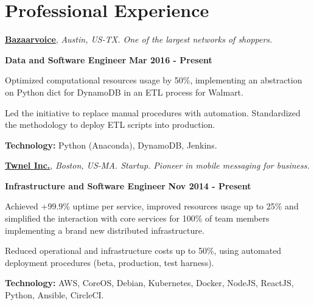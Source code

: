\section{Professional Experience}
%
\href{http://www.bazaarvoice.com/}{\textbf{Bazaarvoice}}, \textit{Austin, US-TX.
One of the largest networks of shoppers.}

\begin{outerlist}
\item[\FA \faAngleDoubleRight] \textbf{Data and Software Engineer}
\hfill
\textbf{Mar 2016 - Present}
\end{outerlist}

\begin{innerlist}
\item Optimized computational resources usage by 50\%, implementing
an abstraction on Python dict for DynamoDB in an ETL process for Walmart.
\item Led the initiative to replace manual procedures with automation.
Standardized the methodology to deploy ETL scripts into production.
\item \textbf{Technology:} Python (Anaconda), DynamoDB, Jenkins.
\end{innerlist}

\quarterblankline

\href{http://www.twnel.com/}{\textbf{Twnel Inc.}}, \textit{Boston, US-MA.
Startup.
Pioneer in mobile messaging for business.}

\begin{outerlist}
\item[\FA \faAngleDoubleRight] \textbf{Infrastructure and Software
Engineer}
\hfill
\textbf{Nov 2014 - Present}
\end{outerlist}

\begin{innerlist}
\item Achieved +99.9\% uptime per
service, improved resources usage up to 25\% and simplified the
interaction with core services for 100\% of team members implementing a brand
new distributed infrastructure.
\item Reduced operational and infrastructure costs up to 50\%, using automated
deployment procedures (beta, production, test harness).
\item \textbf{Technology:} AWS, CoreOS, Debian, Kubernetes, Docker, NodeJS,
ReactJS, Python, Ansible, CircleCI.
\end{innerlist}

\quarterblankline

